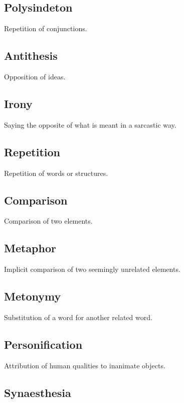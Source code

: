 \documentclass{article}
\begin{document}
\subsection*{Polysindeton}

Repetition of conjunctions.

\subsection*{Antithesis}

Opposition of ideas.

\subsection*{Irony}

Saying the opposite of what is meant in a sarcastic way.

\subsection*{Repetition}

Repetition of words or structures.

\subsection*{Comparison}

Comparison of two elements.

\subsection*{Metaphor}

Implicit comparison of two seemingly unrelated elements.

\subsection*{Metonymy}

Substitution of a word for another related word.

\subsection*{Personification}

Attribution of human qualities to inanimate objects.

\subsection*{Synaesthesia}
\end{document}
